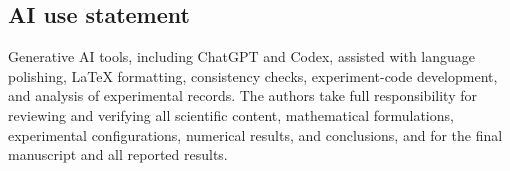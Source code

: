\documentclass{article}
\begin{document}
\subsection*{AI use statement}
Generative AI tools, including ChatGPT and Codex, assisted with language polishing, LaTeX formatting, consistency checks, experiment-code development, and analysis of experimental records. The authors take full responsibility for reviewing and verifying all scientific
content, mathematical formulations, experimental configurations, numerical
results, and conclusions, and for the final manuscript and all reported results.




\appendix





\FloatBarrier

\FloatBarrier

\FloatBarrier

\clearpage


\end{document}
